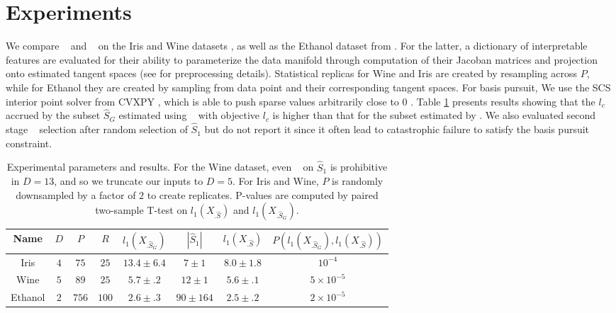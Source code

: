 \section{Experiments}
\label{sec:experiments}

We compare \tsip~ and \greedy~ on the Iris and Wine datasets \citep{misc_iris_53, misc_wine_109, scikit-learn}, as well as the Ethanol dataset from \citet{Chmiela2018-at, Koelle2022-ju}.
For the latter, a dictionary of interpretable features are evaluated for their ability to parameterize the data manifold through computation of their Jacoban matrices and projection onto estimated tangent spaces (see \citet{Koelle2022-ju} for preprocessing details).
Statistical replicas for Wine and Iris are created by resampling across $P$, while for Ethanol they are created by sampling from data point and their corresponding tangent spaces.
For basis pursuit, We use the SCS interior point solver \citep{ocpb:16} from CVXPY \citep{diamond2016cvxpy, agrawal2018rewriting}, which is able to push sparse values arbitrarily close to 0 \citep{cvxpy_sparse_solution}.
Table \ref{tab:experiments} presents results showing that the $l_c$ accrued by the subset $\widehat S_{G}$ estimated using \greedy~ with objective $l_c$ is higher than that for the subset estimated by \tsip.
We also evaluated second stage \brute~ selection after random selection of $\widehat S_1$ but do not report it since it often lead to catastrophic failure to satisfy the basis pursuit constraint.

\begin{table}[h!]
\centering
\begin{tabular}{|c|c|c|c|c|c|c|c|}
\hline
Name & $D$ & $P$ & $R$ & $l_1(X_{.\widehat S_{G}})$ & $ |\widehat S_1 | $& $l_1(X_{.\widehat S})$ & $P(l_1(X_{.\widehat S_{G}}),l_1(X_{.\widehat S}))$  \\ \hline
Iris & $4$ & $75$ & $25$ & $13.4 \pm 6.4$ & $7 \pm 1$ &  $8.0 \pm 1.8$ & $10^{-4}$\\ \hline 
Wine & $5$ & $89$ & $25$  & $5.7 \pm .2$ & $12 \pm 1$ & $5.6 \pm .1$ & $5 \times 10^{-5}$ \\ \hline
Ethanol & $2$ & $756$ & $100$ & $2.6\pm .3$  & $90 \pm 164$  & $2.5\pm .2$& $2 \times 10^{-5}$ \\ \hline
\end{tabular}
\caption{Experimental parameters and results.
For the Wine dataset, even \brute~ on $\widehat { S}_1$ is prohibitive in $D=13$, and so we truncate our inputs to $D=5$.
For Iris and Wine, $P$ is randomly downsampled by a factor of $2$ to create replicates.
P-values are computed by paired two-sample T-test on  $l_1(X_{.\widehat S})$ and $l_1(X_{.\widehat S_{G}})$.
}
\label{tab:experiments}
\end{table}

